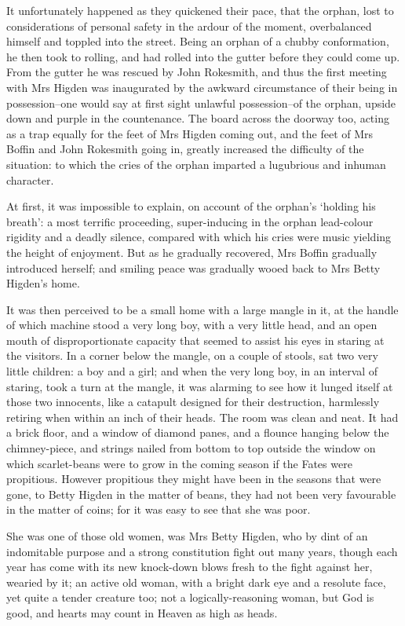 It unfortunately happened as they quickened their pace, that the orphan,
lost to considerations of personal safety in the ardour of the moment,
overbalanced himself and toppled into the street. Being an orphan of a
chubby conformation, he then took to rolling, and had rolled into the
gutter before they could come up. From the gutter he was rescued by John
Rokesmith, and thus the first meeting with Mrs Higden was inaugurated by
the awkward circumstance of their being in possession--one would say at
first sight unlawful possession--of the orphan, upside down and purple
in the countenance. The board across the doorway too, acting as a trap
equally for the feet of Mrs Higden coming out, and the feet of Mrs
Boffin and John Rokesmith going in, greatly increased the difficulty of
the situation: to which the cries of the orphan imparted a lugubrious
and inhuman character.

At first, it was impossible to explain, on account of the orphan’s
‘holding his breath’: a most terrific proceeding, super-inducing in the
orphan lead-colour rigidity and a deadly silence, compared with which
his cries were music yielding the height of enjoyment. But as he
gradually recovered, Mrs Boffin gradually introduced herself; and
smiling peace was gradually wooed back to Mrs Betty Higden’s home.

It was then perceived to be a small home with a large mangle in it, at
the handle of which machine stood a very long boy, with a very little
head, and an open mouth of disproportionate capacity that seemed to
assist his eyes in staring at the visitors. In a corner below the
mangle, on a couple of stools, sat two very little children: a boy and a
girl; and when the very long boy, in an interval of staring, took a turn
at the mangle, it was alarming to see how it lunged itself at those two
innocents, like a catapult designed for their destruction, harmlessly
retiring when within an inch of their heads. The room was clean and
neat. It had a brick floor, and a window of diamond panes, and a flounce
hanging below the chimney-piece, and strings nailed from bottom to top
outside the window on which scarlet-beans were to grow in the coming
season if the Fates were propitious. However propitious they might have
been in the seasons that were gone, to Betty Higden in the matter of
beans, they had not been very favourable in the matter of coins; for it
was easy to see that she was poor.

She was one of those old women, was Mrs Betty Higden, who by dint of
an indomitable purpose and a strong constitution fight out many years,
though each year has come with its new knock-down blows fresh to the
fight against her, wearied by it; an active old woman, with a bright
dark eye and a resolute face, yet quite a tender creature too; not a
logically-reasoning woman, but God is good, and hearts may count in
Heaven as high as heads.

